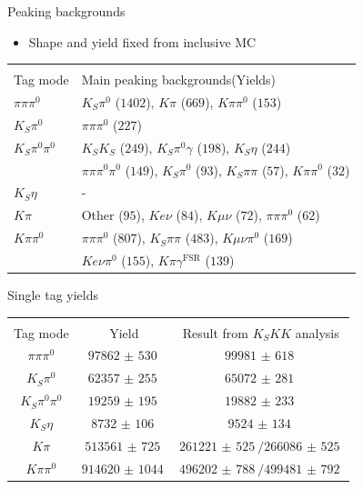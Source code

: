 \documentclass{beamer}
\begin{document}
\begin{frame}{Peaking backgrounds}
  \begin{itemize}
    \item{Shape and yield fixed from inclusive MC}
  \end{itemize}
  \centering
  \def\arraystretch{1.2}%
  \begin{tabular}{ll}
                    & \\
    Tag mode        & Main peaking backgrounds(Yields) \\
    \hline
    $\pi\pi\pi^0$   & $K_S\pi^0$ ($1402$), $K\pi$ ($669$), $K\pi\pi^0$ ($153$) \\
    $K_S\pi^0$      & $\pi\pi\pi^0$ ($227$) \\
    $K_S\pi^0\pi^0$ & $K_SK_S$ ($249$), $K_S\pi^0\gamma$ ($198$), $K_S\eta$ ($244$) \\
                    & $\pi\pi\pi^0\pi^0$ ($149$), $K_S\pi^0$ ($93$), $K_S\pi\pi$ ($57$), $K\pi\pi^0$ ($32$) \\
    $K_S\eta$       & - \\
    $K\pi$          & Other ($95$), $Ke\nu$ ($84$), $K\mu\nu$ ($72$), $\pi\pi\pi^0$ ($62$) \\
    $K\pi\pi^0$     & $\pi\pi\pi^0$ ($807$), $K_S\pi\pi$ ($483$), $K\mu\nu\pi^0$ ($169$) \\
                    & $Ke\nu\pi^0$ ($155$), $K\pi\gamma^\text{FSR}$ ($139$)
    \end{tabular}
\end{frame}

\begin{frame}{Single tag yields}
  \centering
  \def\arraystretch{1.2}%
  \begin{tabular}{ccc}
                    & \\
    Tag mode        & Yield & Result from $K_SKK$ analysis \\
    \hline
    $\pi\pi\pi^0$   & $\SI{97862(530)}{}$ & $\SI{99981(618)}{}$ \\
    $K_S\pi^0$      & $\SI{62357(255)}{}$ & $\SI{65072(281)}{}$ \\
    $K_S\pi^0\pi^0$ & $\SI{19259(195)}{}$ & $\SI{19882(233)}{}$ \\
    $K_S\eta$       & $\SI{8732(106)}{}$ & $\SI{9524(134)}{}$ \\
    $K\pi$          & $\SI{513561(725)}{}$ & $\SI{261221(525)}{}/\SI{266086(525)}{}$ \\
    $K\pi\pi^0$     & $\SI{914620(1044)}{}$ & $\SI{496202(788)}{}/\SI{499481(792)}{}$ \\
    \end{tabular}
\end{frame}
\end{document}
